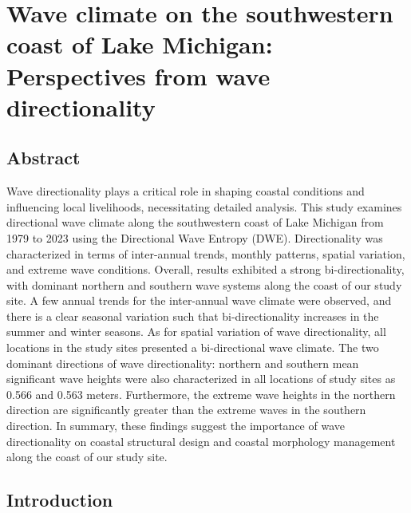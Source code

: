 \chapter{Wave climate on the southwestern coast of Lake Michigan: Perspectives from wave directionality}
\label{chapter3}

\section{Abstract}
\label{c3_Abstract}
Wave directionality plays a critical role in shaping coastal conditions and influencing local livelihoods, necessitating detailed analysis. This study examines directional wave climate along the southwestern coast of Lake Michigan from 1979 to 2023 using the Directional Wave Entropy (DWE). Directionality was characterized in terms of inter-annual trends, monthly patterns, spatial variation, and extreme wave conditions. Overall, results exhibited a strong bi-directionality, with dominant northern and southern wave systems along the coast of our study site. A few annual trends for the inter-annual wave climate were observed, and there is a clear seasonal variation such that bi-directionality increases in the summer and winter seasons. As for spatial variation of wave directionality, all locations in the study sites presented a bi-directional wave climate. The two dominant directions of wave directionality: northern and southern mean significant wave heights were also characterized in all locations of study sites as 0.566 and 0.563 meters. Furthermore, the extreme wave heights in the northern direction are significantly greater than the extreme waves in the southern direction. In summary, these findings suggest the importance of wave directionality on coastal structural design and coastal morphology management along the coast of our study site. 

\section{Introduction}
\label{c3_Introduction}

